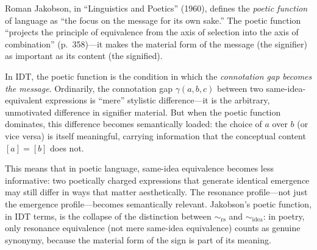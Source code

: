 \begin{interpretation}\label{interp:ch6:jakobson_poetic}
Roman Jakobson, in ``Linguistics and Poetics'' (1960), defines the
\emph{poetic function} of language as ``the focus on the message for its
own sake.'' The poetic function ``projects the principle of equivalence
from the axis of selection into the axis of combination'' (p.~358)---it
makes the material form of the message (the signifier) as important as
its content (the signified).

In IDT, the poetic function is the condition in which the \emph{connotation
gap becomes the message}. Ordinarily, the connotation gap $\gamma(a, b, c)$
between two same-idea-equivalent expressions is ``mere'' stylistic
difference---it is the arbitrary, unmotivated difference in signifier
material. But when the poetic function dominates, this difference becomes
semantically loaded: the choice of $a$ over $b$ (or vice versa) is itself
meaningful, carrying information that the conceptual content $[a] = [b]$
does not.

This means that in poetic language, same-idea equivalence becomes less
informative: two poetically charged expressions that generate identical
emergence may still differ in ways that matter aesthetically. The
resonance profile---not just the emergence profile---becomes
semantically relevant. Jakobson's poetic function, in IDT terms, is the
collapse of the distinction between $\sim_{\text{rs}}$ and
$\sim_{\text{idea}}$: in poetry, only resonance equivalence (not mere
same-idea equivalence) counts as genuine synonymy, because the material
form of the sign is part of its meaning.
\end{interpretation}

